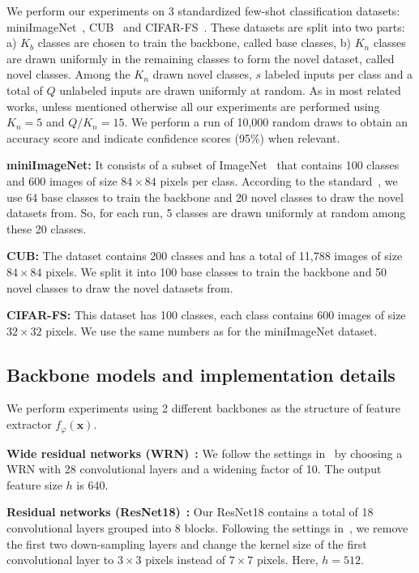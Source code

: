 \documentclass[a4paper,conference]{IEEEtran}
\begin{document}
We perform our experiments on 3 standardized few-shot classification datasets: miniImageNet~\cite{vinyals2016matching}, CUB~\cite{wah2011caltech} and CIFAR-FS~\cite{bertinetto2018meta}. These datasets are split into two parts: a) $K_b$ classes are chosen to train the backbone, called base classes, b) $K_n$ classes are drawn uniformly in the remaining classes to form the novel dataset, called novel classes. Among the $K_n$ drawn novel classes, $s$ labeled inputs per class and a total of $Q$ unlabeled inputs are drawn uniformly at random. As in most related works, unless mentioned otherwise all our experiments are performed using $K_n=5$ and $Q/K_n = 15$. We perform a run of 10,000 random draws to obtain an accuracy score and indicate confidence scores (95\%) when relevant.

\textbf{miniImageNet:} It consists of a subset of ImageNet~\cite{russakovsky2015imagenet} that contains 100 classes and 600 images of size $84\times84$ pixels per class. According to the standard~\cite{ravi2016optimization}, we use 64 base classes to train the backbone and 20 novel classes to draw the novel datasets from. So, for each run, 5 classes are drawn uniformly at random among these 20 classes.

\textbf{CUB:} The dataset contains 200 classes and has a total of 11,788 images of size $84\times84$ pixels. We split it into 100 base classes to train the backbone and 50 novel classes to draw the novel datasets from.

\textbf{CIFAR-FS:} This dataset has 100 classes, each class contains 600 images of size $32\times32$ pixels. We use the same numbers as for the miniImageNet dataset.

\subsection{Backbone models and implementation details}
We perform experiments using 2 different backbones as the structure of feature extractor $f_\varphi(\mathbf{x})$.

\textbf{Wide residual networks (WRN)}~\cite{zagoruyko2016wide}\textbf{:} We follow the settings in~\cite{mangla2020charting} by choosing a WRN with 28 convolutional layers and a widening factor of 10. The output feature size $h$ is 640.

\textbf{Residual networks (ResNet18)}~\cite{he2016deep}\textbf{:} Our ResNet18 contains a total of 18 convolutional layers grouped into 8 blocks. Following the settings in~\cite{wang2019simpleshot}, we remove the first two down-sampling layers and change the kernel size of the first convolutional layer to $3\times3$ pixels instead of $7\times7$ pixels. Here, $h=512$.
\end{document}
